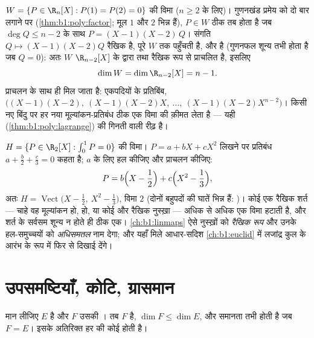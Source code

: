 \begin{example}[रास्ता 2, पूरा]
\label{ex:b1:findim:route2}
$W = \{P \in \R_n[X] : P(1) = P(2) = 0\}$ की विमा ($n \geq 2$ के लिए)।
गुणनखंड प्रमेय को दो बार लगाने पर (\cref{thm:b1:poly:factor}; मूल $1$ और $2$
भिन्न हैं), $P \in W$ ठीक तब होता है जब $\deg Q \leq n - 2$ के साथ $P = (X -
1)(X - 2)\,Q$। संगति $Q \mapsto (X-1)(X-2)Q$ रैखिक है, पूरे $W$ तक पहुँचती
है, और  है (गुणनफल शून्य तभी होता है जब $Q = 0$): अतः $W$ $\R_{n-2}[X]$
के द्वारा  तथा रैखिक रूप से प्राचलित है, इसलिए
\[
\dim W = \dim \R_{n-2}[X] = n - 1 .
\]
 प्राचलन के साथ ही मिल जाता है: एकपदियों के प्रतिबिंब,
$\bigl((X-1)(X-2),\ (X-1)(X-2)X,\ \dots,\ (X-1)(X-2)X^{n-2}\bigr)$। किसी नए
बिंदु पर हर नया मूल्यांकन-प्रतिबंध ठीक एक विमा की क़ीमत लेता है --- यही
 (\cref{thm:b1:poly:lagrange}) की गिनती वाली रीढ़ है।
\end{example}

\begin{example}[समाकल वाला प्रतिबंध भी एक विमा लेता है]
\label{ex:b1:findim:integralconstraint}
$H = \{P \in \R_2[X] : \int_0^1 P = 0\}$ की विमा। $P = a + bX + cX^2$ लिखने
पर प्रतिबंध $a + \frac b2 + \frac c3 = 0$ कहता है; $a$ के लिए हल कीजिए और
प्राचलन कीजिए:
\[
P = b\Bigl(X - \frac12\Bigr) + c\Bigl(X^2 - \frac13\Bigr),
\]
अतः $H = \operatorname{Vect}\bigl(X - \frac12,\ X^2 - \frac13\bigr)$, विमा
$2$ (दोनों बहुपदों की घातें भिन्न हैं: )। कोई एक रैखिक शर्त --- चाहे
वह मूल्यांकन हो,  हो, या कोई और रैखिक नुस्ख़ा --- अधिक से अधिक एक विमा
हटाती है, और शर्त के सर्वसम शून्य न होते ही ठीक एक। \cref{ch:b1:linmaps} ऐसे
नुस्ख़ों को \emph{रैखिक रूप} और उनके हल-समुच्चयों को \emph{अधिसमतल} नाम
देगा; और यहाँ मिले आधार-सदिश \cref{ch:b1:euclid} में लजांद्र कुल के आरंभ के
रूप में फिर से दिखाई देंगे।
\end{example}

\section{उपसमष्टियाँ, कोटि, ग्रासमान}

\begin{theorem}[उपसमष्टियाँ]\label{thm:b1:findim:subspaces}
मान लीजिए $E$  है और $F$ उसकी । तब $F$  है,
$\dim F \leq \dim E$, और समानता तभी होती है जब $F = E$। इसके अतिरिक्त हर
 की कोई   होती है।
\end{theorem}

